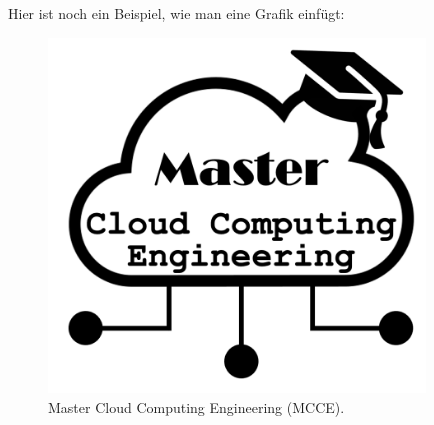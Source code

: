 \newpage
Hier ist noch ein Beispiel, wie man eine Grafik einfügt:
\begin{figure}[H]
	\centering
	\includegraphics[width=10cm]{fig/Fig1.png}
	\caption{Master Cloud Computing Engineering (MCCE).}
	\label{fig:Fig1}
\end{figure}